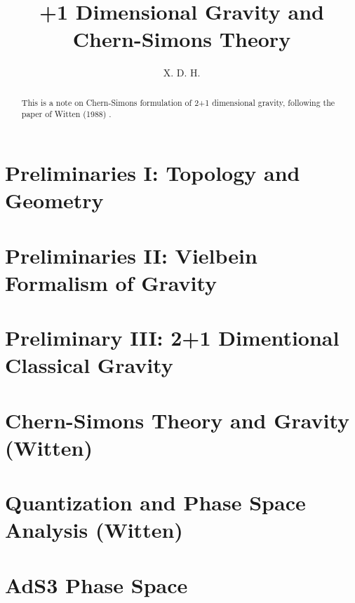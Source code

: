 \documentclass[11pt]{article}
\begin{document}
\title{+1 Dimensional Gravity and Chern-Simons Theory}
\author{X. D. H.}

\maketitle

\begin{abstract}
  This is a note on Chern-Simons
  formulation of 2+1 dimensional gravity, following the paper of
  Witten (1988)\cite{witten21Dimensional1988}  .
\end{abstract}

\tableofcontents
\newpage
\section{Preliminaries I: Topology and Geometry}


\newpage
\section{Preliminaries II: Vielbein Formalism of
Gravity}\label{sec:Preliminaries II: 2+1 Dimensinal Gravity
Fundamentals} %


\newpage
\section{Preliminary III: 2+1 Dimentional Classical
Gravity}\label{sec:} %


\newpage
\section{Chern-Simons Theory and Gravity
(Witten)}\label{sec:chern-simons theory and gravity (witten)} %


\newpage
\section{Quantization and Phase Space Analysis
(Witten)}\label{sec:Quantization of 3D Gravity} %


\newpage
\section{AdS3 Phase Space}\label{sec:AdS3 Phase Space} %


\newpage
\printbibliography
\end{document}
